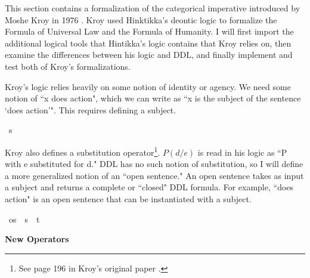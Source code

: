 %
\begin{isabellebody}%
%
%
\isadelimtheory
%
\endisadelimtheory
%
\isatagtheory
%
\endisatagtheory
{\isafoldtheory}%
%
\isadelimtheory
%
\endisadelimtheory
%
\isadelimdocument
%
\endisadelimdocument
%
\isatagdocument
%
\isamarkuptrue%
%
\endisatagdocument
{\isafolddocument}%
%
\isadelimdocument
%
\endisadelimdocument
%
\begin{isamarkuptext}%
This section contains a formalization of the categorical imperative introduced by Moshe Kroy in 
1976 \cite{kroy}. Kroy used Hinktikka's deontic logic to formalize the Formula of Universal Law and
the Formula of Humanity. I will first import the additional logical tools that Hintikka's logic contains 
that Kroy relies on, then examine the differences between his logic and DDL, and finally implement 
and test both of Kroy's formalizations.%
\end{isamarkuptext}\isamarkuptrue%
%
\isadelimdocument
%
\endisadelimdocument
%
\isatagdocument
%
\isamarkuptrue%
%
\endisatagdocument
{\isafolddocument}%
%
\isadelimdocument
%
\endisadelimdocument
%
\begin{isamarkuptext}%
Kroy's logic relies heavily on some notion of identity or agency. We need some notion of ``x does action", 
which we can write as ``x is the subject of the sentence `does action'". This requires defining a subject.%
\end{isamarkuptext}\isamarkuptrue%
\isamarkupfalse%
\ s\ %
%
\begin{isamarkuptext}%
Kroy also defines a substitution operator\footnote{See page 196 in Kroy's original paper \cite{kroy}.}. $P (d/e)$ is read in his logic as ``P with e substituted 
for d." DDL has no such notion of substitution, so I will define a more generalized notion of an ``open 
sentence." An open sentence takes as input a subject and returns a complete or ``closed" DDL formula. For example, 
``does action" is an open sentence that can be instantiated with a subject.%
\end{isamarkuptext}\isamarkuptrue%
\isamarkupfalse%
\ os\ {\isacharequal}\ {\isachardoublequoteopen}{\isacharparenleft}s\ {\isasymRightarrow}\ t{\isacharparenright}{\isachardoublequoteclose}\isanewline
%
\isanewline
%
%
\begin{isamarkuptext}%
\textbf{New Operators}


\end{isamarkuptext}
\end{isabellebody}
